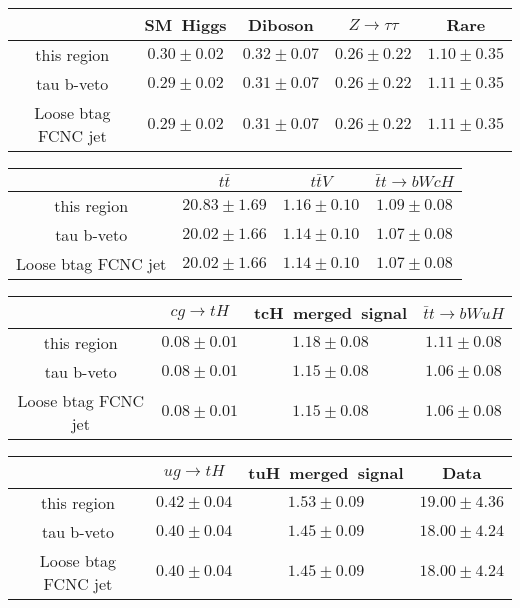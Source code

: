\centering
\begin{tabular}{|c|c|c|c|c|} \hline
 & SM~Higgs & Diboson & $Z\to \tau\tau$ & Rare\\\hline
this region & $0.30\pm0.02$ & $0.32\pm0.07$ & $0.26\pm0.22$ & $1.10\pm0.35$\\\hline
tau b-veto & $0.29\pm0.02$ & $0.31\pm0.07$ & $0.26\pm0.22$ & $1.11\pm0.35$\\\hline
Loose btag FCNC jet & $0.29\pm0.02$ & $0.31\pm0.07$ & $0.26\pm0.22$ & $1.11\pm0.35$\\\hline
\end{tabular}
\begin{tabular}{|c|c|c|c|} \hline
 & $t\bar{t}$ & $t\bar{t}V$ & $\bar{t}t\to bWcH$\\\hline
this region & $20.83\pm1.69$ & $1.16\pm0.10$ & $1.09\pm0.08$\\\hline
tau b-veto & $20.02\pm1.66$ & $1.14\pm0.10$ & $1.07\pm0.08$\\\hline
Loose btag FCNC jet & $20.02\pm1.66$ & $1.14\pm0.10$ & $1.07\pm0.08$\\\hline
\end{tabular}
\begin{tabular}{|c|c|c|c|} \hline
 & $cg\to tH$ & tcH~merged~signal & $\bar{t}t\to bWuH$\\\hline
this region & $0.08\pm0.01$ & $1.18\pm0.08$ & $1.11\pm0.08$\\\hline
tau b-veto & $0.08\pm0.01$ & $1.15\pm0.08$ & $1.06\pm0.08$\\\hline
Loose btag FCNC jet & $0.08\pm0.01$ & $1.15\pm0.08$ & $1.06\pm0.08$\\\hline
\end{tabular}
\begin{tabular}{|c|c|c|c|} \hline
 & $ug\to tH$ & tuH~merged~signal & Data\\\hline
this region & $0.42\pm0.04$ & $1.53\pm0.09$ & $19.00\pm4.36$\\\hline
tau b-veto & $0.40\pm0.04$ & $1.45\pm0.09$ & $18.00\pm4.24$\\\hline
Loose btag FCNC jet & $0.40\pm0.04$ & $1.45\pm0.09$ & $18.00\pm4.24$\\\hline
\end{tabular}
